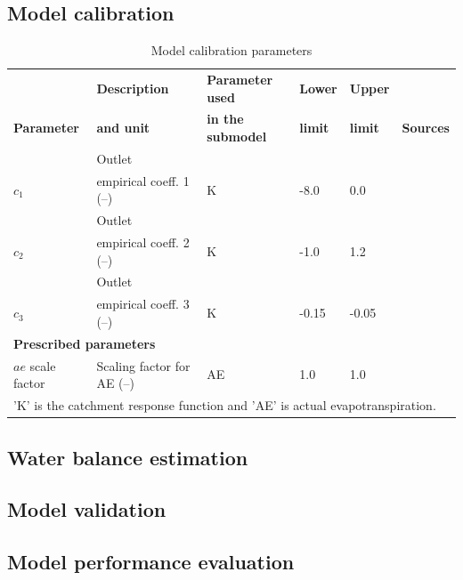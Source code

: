 \subsection{Model calibration}

\begin{table}[ht]
\centering
\caption{Model calibration parameters}
\label{tab:cali_parms}
\begin{tabular}{llllll}
&
  \textbf{Description} &
  \textbf{Parameter used} &
  \textbf{Lower} &
  \textbf{Upper} &
    \\ 
\textbf{Parameter} &
  \textbf{and unit} &
  \textbf{in the submodel} &
  \textbf{limit} &
  \textbf{limit} &
  \textbf{Sources} \\ \toprule
& Outlet & & & &  \\
$c_1$             & empirical coeff. 1 (–) & K  & -8.0  & 0.0   & \cite{sapkota2016regional, lombrana17} \\
& Outlet & & & &  \\
$c_2$             & empirical coeff. 2 (–) & K  & -1.0  & 1.2   & \cite{sapkota2016regional, lombrana17}  \\
& Outlet & & & &  \\
$c_3$             & empirical coeff. 3 (–) & K  & -0.15 & -0.05 & \cite{sapkota2016regional, lombrana17}  \\
\multicolumn{6}{l}{\textbf{Prescribed parameters}}                             \\ \hline
$ae$ scale factor & Scaling factor for AE (–)          & AE & 1.0   & 1.0   & \cite{sapkota2016regional, lombrana17}  \\ 
\bottomrule

\multicolumn{6}{l}{'K' is the catchment response function and 'AE' is actual evapotranspiration.}   \\      
\end{tabular}
\end{table}

\subsection{Water balance estimation}

\subsection{Model validation}

\subsection{Model performance evaluation}